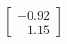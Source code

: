 \documentclass[preview]{standalone}
\begin{document}
\begin{align*}
\begin{bmatrix} -0.92 \\ -1.15 \end{bmatrix}
\end{align*}
\end{document}
